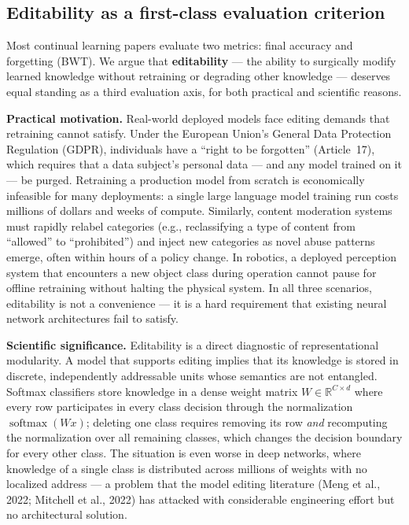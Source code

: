 \documentclass[11pt,a4paper]{article}
\begin{document}
\subsection{Editability as a first-class evaluation criterion}

Most continual learning papers evaluate two metrics: final accuracy and forgetting (BWT). We argue that \textbf{editability} --- the ability to surgically modify learned knowledge without retraining or degrading other knowledge --- deserves equal standing as a third evaluation axis, for both practical and scientific reasons.

\textbf{Practical motivation.} Real-world deployed models face editing demands that retraining cannot satisfy. Under the European Union's General Data Protection Regulation (GDPR), individuals have a ``right to be forgotten'' (Article~17), which requires that a data subject's personal data --- and any model trained on it --- be purged. Retraining a production model from scratch is economically infeasible for many deployments: a single large language model training run costs millions of dollars and weeks of compute. Similarly, content moderation systems must rapidly relabel categories (e.g., reclassifying a type of content from ``allowed'' to ``prohibited'') and inject new categories as novel abuse patterns emerge, often within hours of a policy change. In robotics, a deployed perception system that encounters a new object class during operation cannot pause for offline retraining without halting the physical system. In all three scenarios, editability is not a convenience --- it is a hard requirement that existing neural network architectures fail to satisfy.

\textbf{Scientific significance.} Editability is a direct diagnostic of representational modularity. A model that supports editing implies that its knowledge is stored in discrete, independently addressable units whose semantics are not entangled. Softmax classifiers store knowledge in a dense weight matrix $W \in \mathbb{R}^{C \times d}$ where every row participates in every class decision through the normalization $\operatorname{softmax}(Wx)$; deleting one class requires removing its row \textit{and} recomputing the normalization over all remaining classes, which changes the decision boundary for every other class. The situation is even worse in deep networks, where knowledge of a single class is distributed across millions of weights with no localized address --- a problem that the model editing literature (Meng et al., 2022; Mitchell et al., 2022) has attacked with considerable engineering effort but no architectural solution.
\end{document}
